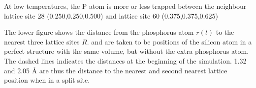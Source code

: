 \documentclass[11pt,bibliography=totoc,index=totoc]{scrbook}   %
\begin{document}
At low temperatures, the P atom is more or less trapped between the neighbour lattice site 28 (0.250,0.250,0.500) and lattice site 60 (0.375,0.375,0.625)

  The lower figure shows the distance from the phosphorus atom $r(t)$ to the nearest three lattice sites $R$.
  and are taken to be positions of the silicon atom in a perfect structure with the same volume, but without the extra phosphorus atom.
  The dashed lines indicates the distances at the beginning of the simulation. 1.32 and 2.05 Å are thus the distance to the nearest
  and second nearest lattice position when in a split site.

\end{document}
